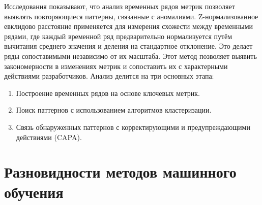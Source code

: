 Исследования показывают, что анализ временных рядов метрик позволяет выявлять повторяющиеся паттерны, связанные с аномалиями. Z-нормализованное евклидово расстояние применяется для измерения схожести между временными рядами, где каждый временной ряд предварительно нормализуется путём вычитания среднего значения и деления на стандартное отклонение. Это делает ряды сопоставимыми независимо от их масштаба. Этот метод позволяет выявить закономерности в изменениях метрик и сопоставить их с характерными действиями разработчиков. Анализ делится на три основных этапа:
\begin{enumerate}
	\item Построение временных рядов на основе ключевых метрик.
	\item Поиск паттернов с использованием алгоритмов кластеризации.
	\item Связь обнаруженных паттернов с корректирующими и предупреждающими действиями (CAPA).
\end{enumerate}

\begin{table}[htbp]
	\centering
	\caption{Примеры паттернов аномалий и их интерпретация}
	\label{tab:patterns}
\end{table}

\section{Разновидности методов машинного обучения} \label{ch1:sec3}

